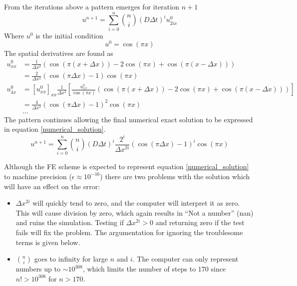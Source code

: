 \noindent From the iterations above a pattern emerges for iteration $n+1$\\
\begin{equation}
 u^{n+1} = \sum\limits_{i=0}^n {n\choose i}\left(D\Delta t\right)^iu^0_{2ix}
\end{equation}
Where $u^0$ is the initial condition
\begin{equation}
 u^0 = \cos(\pi x)
\end{equation}
The spatial derivatives are found as
\begin{align*}
 u^0_{xx} &= \frac{1}{\Delta x^2}\left(\cos(\pi(x+\Delta x)) -2\cos(\pi x) +\cos(\pi(x-\Delta x))\right) \\
 &= \frac{2}{\Delta x^2}\left(\cos(\pi\Delta x)-1\right)\cos(\pi x)\\
 u^0_{4x} &= [u^0_{xx}]_{xx} \frac{1}{\Delta x^2}\left[\frac{u^0_{xx}}{\cos(\pi x)}\left(\cos(\pi(x+\Delta x)) -2\cos(\pi x) +\cos(\pi(x-\Delta x))\right)\right]\\
 &= \frac{4}{\Delta x^2}\left(\cos(\pi\Delta x)-1\right)^2\cos(\pi x)\\
 &\dots
\end{align*}
The pattern continues allowing the final numerical exact solution to be expressed in equation \eqref{numerical_solution}.
\begin{equation}\label{numerical_solution}
  u^{n+1} = \sum\limits_{i=0}^n {n\choose i}\left(D\Delta t\right)^i\frac{2^i}{\Delta x^{2i}}\left(\cos(\pi\Delta x)-1\right)^i\cos(\pi x)
\end{equation}

Although the FE scheme is expected to represent equation \eqref{numerical_solution} to machine precision ($\epsilon \approx 10^{-16}$) there are two problems with the solution which will have an effect on the error:
\begin{itemize}
 \item $\Delta x^{2i}$ will quickly tend to zero, and the computer will interpret it as zero. This will cause division by zero, which again results in ``Not a number'' (nan) and ruins the simulation. Testing if $\Delta x^{2i}>0$ and returning zero if the test fails will fix the problem. The argumentation for ignoring the troublesome terms is given below.
 \item ${n\choose i}$ goes to infinity for large $n$ and $i$. The computer can only represent numbers up to $\sim10^{308}$, which limits the number of steps to $170$ since $n!>10^{308}$ for $n>170$.
\end{itemize}

